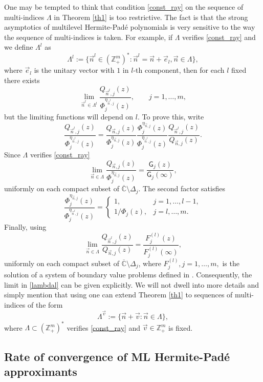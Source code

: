 \documentclass{amsart}
\numberwithin{equation}{section}
\theoremstyle{definition}
\newcommand{\ZZ}{\mathbb{Z}}      %
\newcommand{\CC}{\mathbb{C}}      %
\newcommand{\n}{\vec{n}}          %
\begin{document}
One may be tempted to think that condition  \eqref{const_ray} on the sequence of multi-indices $\Lambda$ in Theorem \ref{th1} is too restrictive. The fact is that the strong asymptotics of multilevel Hermite-Pad\'e polynomials is very sensitive to the way the sequence of multi-indices is taken. For example, if $\Lambda$ verifies \eqref{const_ray} and we define ${\Lambda}^l$ as
\[
  {\Lambda}^l := \{{\n}^l \in (\mathbb{Z}_+^m)^*: {\n}^l = \n + \vec{e}_l, \n \in \Lambda\},
\]
where $\vec{e}_l$ is the unitary vector with $1$ in $l$-th component, then for each $l$ fixed there exists
\begin{equation}
	\label{lambdal}
	\lim_{\n^l \in \Lambda^l} \frac{Q_{\n^l,j}(z)}{\Phi_{j}^{\eta_{\n^l,j}}(z)}, \qquad j=1,\ldots,m,
\end{equation}
but the limiting functions will depend on $l$. To prove this, write
\[
  \frac{Q_{\n^l,j}(z)}{\Phi_{j}^{\eta_{\n^l,j}}(z)} = \frac{Q_{\n,j}(z)}{\Phi_{j}^{\eta_{\n,j}}(z)}  \frac{ \Phi_{j}^{\eta_{\n,j}}(z)}{\Phi_{j}^{\eta_{\n^l,j}}(z)}\frac{Q_{\n^l,j}(z)}{Q_{\n,j}(z)}.
\]
Since $\Lambda $ verifies \eqref{const_ray}
\[
  \lim_{\n \in \Lambda} \frac{Q_{\n,j}(z)}{\Phi_{j}^{\eta_{\n,j}}(z)} = \frac{\mathsf{G}_j (z)}{\mathsf{G}_j (\infty)},
\]
uniformly on each compact subset of $\overline{\CC} \setminus \Delta_j$.
The second factor satisfies
\[
  \frac{ \Phi_{j}^{\eta_{\n,j}}(z)}{\Phi_{j}^{\eta_{\n^l,j}}(z)} =
\left\{
\begin{array}{cc}
1,  & j = 1,\ldots,l-1 , \\
1/\Phi_{j}(z), & j=l,\ldots,m .
\end{array}
\right.
\]
Finally, using \cite[Theorem 3.4]{SLL22}
\[ \lim_{\n \in \Lambda}  \frac{Q_{\n^l,j}(z)}{Q_{\n,j}(z)} =  \frac{{F}_j^{(l)}(z)}{{F}_j^{(l)}(\infty)},
\]
uniformly on each compact subset of $\overline{\CC} \setminus \Delta_j$, where
$ {F}_j^{(l)}, j=1,\ldots,m,$ is the solution of a system of boundary value problems defined in  \cite[Lemma 3.3]{SLL22}. Consequently, the limit in \eqref{lambdal} can be given explicitly. We will not dwell into more details and simply mention that using \cite[Theorem 3.4]{SLL22} one can extend Theorem \ref{th1} to sequences of multi-indices of the form
\[
  \Lambda^{\vec{v}} := \{\n +\vec{v}: \n \in \Lambda\},
\]
where $\Lambda \subset (\ZZ_+^m)^*$ verifies \eqref{const_ray} and $\vec{v} \in \ZZ_+^m$ is fixed.



\subsection{Rate of convergence of ML Hermite-Pad\'e approximants}
\end{document}

